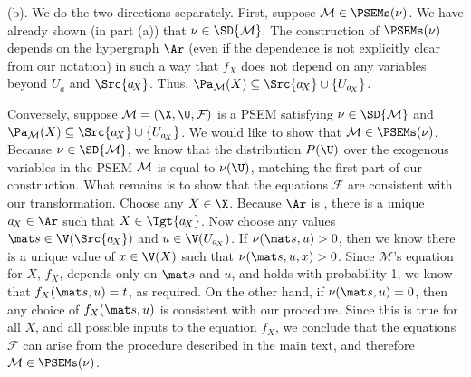 \begin{subappendices}
\begin{lproof}
    
    (b). 
    We do the two directions separately. 
    First, suppose $\mathcal M \in \PSEMs(\nu)$.
    We have already shown (in part (a)) that $\nu \in \SD{\mathcal M}$. 
    The construction of $\PSEMs(\nu)$ depends on the hypergraph $\Ar$ (even if the dependence is not explicitly clear from our notation)
    in such a way that $f_X$ does not depend on any variables beyond $U_a$ and $\Src {a_{\!X}}$. Thus, $\Pa_{\mathcal M}(X) \subseteq \Src {a_{\!X}} \cup \{U_{a_{\!X}}\}$.
    
    Conversely, suppose $\mathcal M = (\X,\U, \mathcal F)$ is a PSEM satisfying $\nu \in \SD{\cal M}$ and $\Pa_{\cal M}(X) \subseteq \Src{a_{\!X}} \cup \{U_{a_{\!X}}\}$. 
    We would like to show that $\mathcal M \in \PSEMs(\nu)$. 
    Because $\nu \in \SD{\cal M}$, we know that the distribution $P(\U)$ over the exogenous variables in the PSEM $\cal M$ is equal to $\nu(\U)$, matching the first part of our construction.
    What remains is to show that the equations $\mathcal F$ are consistent with our transformation. 
    Choose any $X \in \X$. Because $\Ar$ is \subpartl, there is a unique $a_{\!X} \in \Ar$ such that $X \in \Tgt{ a_{\!X}}$. Now choose any values $\mat s \in \V(\Src {a_{\!X}})$ and $u \in \V(U_{a_{\!X}})$.
    If $\nu(\mat s, u) > 0$, then we know there is a unique value of $x \in \V(X)$ such that $\nu(\mat s, u, x) > 0$. Since $\mathcal M$'s equation for $X$, $f_{X}$, depends only on $\mat s$ and $u$, and holds with probability 1, we know that $f_X(\mat s, u) = t$, as required. 
    On the other hand, if $\nu(\mat s, u) = 0$, then any choice of $f_X(\mat s, u)$ is consistent with our procedure. 
    Since this is true for all $X$, and all possible inputs to the equation $f_X$, we conclude that the equations $\mathcal F$ can arise from the procedure described in the main text,
    and therefore $\mathcal M \in \PSEMs(\nu)$.     
\end{lproof}


\end{subappendices}
